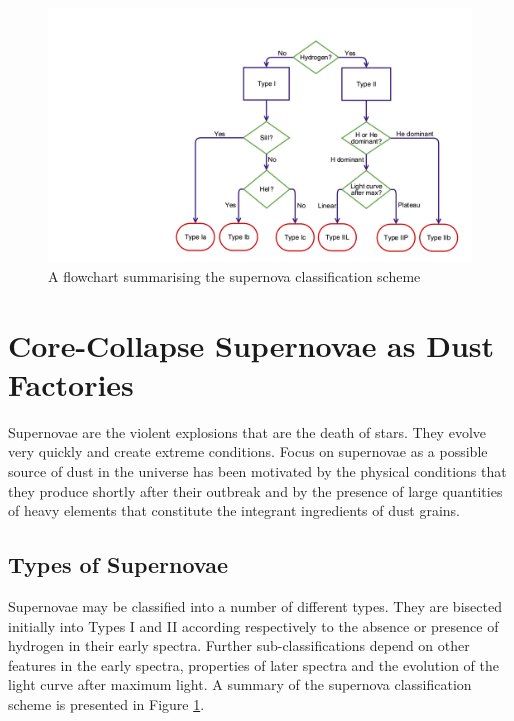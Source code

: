 \begin{figure}
\centering
\includegraphics[clip=true, scale = 0.2, trim= 930 50 55 210]{chapters/chapter1/figs/sn_classification.png}
\caption{A flowchart summarising the supernova classification scheme}
\label{intro:fig:sn_class}
\end{figure}

\section{Core-Collapse Supernovae as Dust Factories}

Supernovae are the violent explosions that are the death of stars.  They evolve very quickly and create extreme conditions.  Focus on supernovae as a possible source of dust in the universe has been motivated by the physical conditions that they produce shortly after their outbreak and by the presence of large quantities of heavy elements that constitute the integrant ingredients of dust grains.




\subsection{Types of Supernovae}

Supernovae may be classified into a number of different types.  They are bisected initially into Types I and II according respectively to the absence or presence of hydrogen in their early spectra.  Further sub-classifications depend on  other features in the early spectra, properties of later spectra and the evolution of the  light curve after maximum light.  A summary of the supernova classification scheme is presented in Figure \ref{intro:fig:sn_class}.  



